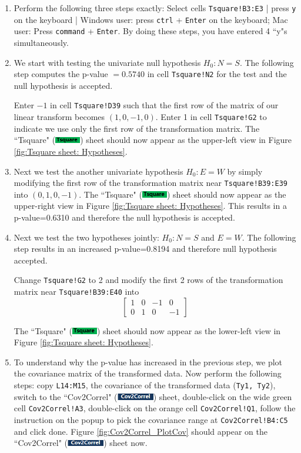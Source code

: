 \documentclass[article]{jss}
\numberwithin{equation}{subsection}
\newcommand{\shtTsquare}{``Tsquare" (\includegraphics[height=8pt, keepaspectratio=true]{img/TsquareSheetTab_png}) }
\newcommand{\shtCovCorrel}{``Cov2Correl" (\includegraphics[height=8pt, keepaspectratio=true]{img/Cov2CorrelSheetTab_png}) }
\begin{document}
        \begin{enumerate}
        	\item Perform the following three steps exactly: Select cells \texttt{Tsquare!B3:E3} | press \texttt{y} on the keyboard | Windows user: press \texttt{ctrl} + \texttt{Enter} on the keyboard; Mac user: Press \texttt{command} + \texttt{Enter}. By doing these steps, you have entered 4 ``y"s simultaneously.
        	
        	\item We start with testing the univariate null hypothesis $H_0: N = S$. The following step computes the p-value $=0.5740$ in cell \texttt{Tsquare!N2} for the test and the null hypothesis is accepted.
        	
        	Enter $-1$ in cell \texttt{Tsquare!D39} such that the first row of the matrix of our linear transform becomes $(1,0,-1,0)$. Enter 1 in cell \texttt{Tsquare!G2} to indicate we use only the first row of the transformation matrix. The \shtTsquare sheet should now appear as the upper-left view in Figure \ref{fig:Tsquare sheet: Hypotheses}.
        	
        	\item Next we test the another univariate hypothesis $H_0: E = W$ by simply modifying the first row of the transformation matrix near \texttt{Tsquare!B39:E39} into $(0,1,0,-1)$. The \shtTsquare sheet should now appear as the upper-right view in Figure \ref{fig:Tsquare sheet: Hypotheses}. This results in a p-value=0.6310 and therefore the null hypothesis is accepted.
        	
        	
        	\item Next we test the two hypotheses jointly: $H_0: N=S$ and $E=W$. The following step results in an increased p-value=0.8194 and therefore null hypothesis accepted.
        	
        	Change \texttt{Tsquare!G2} to 2 and modify the first 2 rows of the transformation matrix near \texttt{Tsquare!B39:E40} into 
        	\[\left[ {\begin{array}{*{20}{c}}
        		1&0&-1&0 \\ 
        		0&1&0&-1
        		\end{array}} \right]\]
        	
        	
        	The \shtTsquare sheet should now appear as the lower-left view in Figure \ref{fig:Tsquare sheet: Hypotheses}.
        	
        	\item To understand why the p-value has increased in the previous step, we plot the covariance matrix of the transformed data. Now perform the following steps: copy \texttt{L14:M15}, the covariance of the transformed data (\texttt{Ty1, Ty2}), switch to the \shtCovCorrel sheet, double-click on the wide green cell \texttt{Cov2Correl!A3}, double-click on the orange cell \texttt{Cov2Correl!Q1}, follow the instruction on the popup to pick the covariance range at \texttt{Cov2Correl!B4:C5} and click done. Figure \ref{fig:Cov2Correl_PlotCov} should appear on the \shtCovCorrel sheet now.
        	

\end{enumerate}
\end{document}
